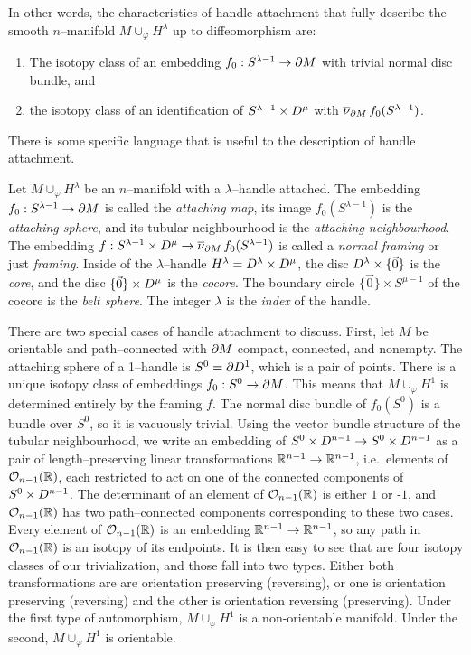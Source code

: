 In other words, the characteristics of handle attachment that fully describe the smooth $n$--manifold $M\cup_\varphi H^\lambda$ up to diffeomorphism are:
\begin{enumerate}
	\item The isotopy class of an embedding $f_0:S^{\lambda-1}\to\partial M$ with trivial normal disc bundle, and 
	\item the isotopy class of an identification of $S^{\lambda-1}\times D^\mu$ with $\overline{\nu}_{\partial M}\,f_0(S^{\lambda-1})$.
\end{enumerate}

There is some specific language that is useful to the description of handle attachment.

\begin{defn}
	Let $M\cup_\varphi H^\lambda$ be an $n$--manifold with a $\lambda$--handle attached.
	The embedding $f_0:S^{\lambda-1}\to\partial M$ is called the \emph{attaching map}, its image $f_0(S^{\lambda-1})$ is the \emph{attaching sphere}, and its tubular neighbourhood is the \emph{attaching neighbourhood}.
	The embedding $f: S^{\lambda-1}\times D^\mu\to \overline{\nu}_{\partial M}\,f_0(S^{\lambda-1})$ is called a \emph{normal framing} or just \emph{framing}.
	Inside of the $\lambda$--handle $H^\lambda=D^\lambda\times D^\mu$, the disc $D^\lambda\times\{\vec{0}\}$ is the \emph{core}, and the disc $\{\vec{0}\}\times D^\mu$ is the \emph{cocore}.
	The boundary circle $\{\vec{0}\}\times S^{\mu-1}$ of the cocore is the \emph{belt sphere}.
	The integer $\lambda$ is the \emph{index} of the handle.
\end{defn}

There are two special cases of handle attachment to discuss.
First, let $M$ be orientable and path--connected with $\partial M$ compact, connected, and nonempty.
The attaching sphere of a 1--handle is $S^0=\partial D^1$, which is a pair of points.
There is a unique isotopy class of embeddings $f_0:S^0\to\partial M$.
This means that $M\cup_\varphi H^1$ is determined entirely by the framing $f$.
The normal disc bundle of $f_0(S^0)$ is a bundle over $S^0$, so it is vacuously trivial.
Using the vector bundle structure of the tubular neighbourhood, we write an embedding of $S^0\times D^{n-1}\to S^0\times D^{n-1}$ as a pair of length--preserving linear transformations $\mathbb{R}^{n-1}\to\mathbb{R}^{n-1}$, i.e.\ elements of $\mathcal{O}_{n-1}({\mathbb{R}})$, each restricted to act on one of the connected components of $S^0\times D^{n-1}$.
The determinant of an element of $\mathcal{O}_{n-1}({\mathbb{R}})$ is either $1$ or -$1$, and $\mathcal{O}_{n-1}({\mathbb{R}})$ has two path--connected components corresponding to these two cases.
Every element of $\mathcal{O}_{n-1}({\mathbb{R}})$ is an embedding $\mathbb{R}^{n-1}\to\mathbb{R}^{n-1}$, so any path in $\mathcal{O}_{n-1}({\mathbb{R}})$ is an isotopy of its endpoints.
It is then easy to see that are four isotopy classes of our trivialization, and those fall into two types.
Either both transformations are are orientation preserving (reversing), or one is orientation preserving (reversing) and the other is orientation reversing (preserving).
Under the first type of automorphism, $M\cup_\varphi H^1$ is a non-orientable manifold.
Under the second, $M\cup_\varphi H^1$ is orientable.

